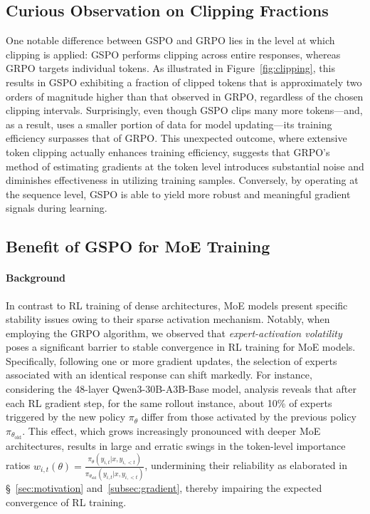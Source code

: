 \subsection{Curious Observation on Clipping Fractions}

One notable difference between GSPO and GRPO lies in the level at which clipping is applied: GSPO performs clipping across entire responses, whereas GRPO targets individual tokens. As illustrated in Figure~\ref{fig:clipping}, this results in GSPO exhibiting a fraction of clipped tokens that is approximately two orders of magnitude higher than that observed in GRPO, regardless of the chosen clipping intervals. Surprisingly, even though GSPO clips many more tokens—and, as a result, uses a smaller portion of data for model updating—its training efficiency surpasses that of GRPO. This unexpected outcome, where extensive token clipping actually enhances training efficiency, suggests that GRPO's method of estimating gradients at the token level introduces substantial noise and diminishes effectiveness in utilizing training samples. Conversely, by operating at the sequence level, GSPO is able to yield more robust and meaningful gradient signals during learning.

\subsection{Benefit of GSPO for MoE Training}
\label{subsec:routing_replay}

\paragraph{Background}
In contrast to RL training of dense architectures, MoE models present specific stability issues owing to their sparse activation mechanism. Notably, when employing the GRPO algorithm, we observed that \textit{expert-activation volatility} poses a significant barrier to stable convergence in RL training for MoE models. Specifically, following one or more gradient updates, the selection of experts associated with an identical response can shift markedly. For instance, considering the 48-layer Qwen3-30B-A3B-Base model, analysis reveals that after each RL gradient step, for the same rollout instance, about 10\% of experts triggered by the new policy $\pi_{\theta}$ differ from those activated by the previous policy $\pi_{\theta_\text{old}}$.
This effect, which grows increasingly pronounced with deeper MoE architectures, results in large and erratic swings in the token-level importance ratios $w_{i,t}(\theta) = \frac{ \pi_{\theta} (y_{i,t} | x, y_{i,<t}) }{ \pi_{\theta_\text{old}} (y_{i,t} | x,y_{i,<t})}$, undermining their reliability as elaborated in \S~\ref{sec:motivation} and~\ref{subsec:gradient}, thereby impairing the expected convergence of RL training.

